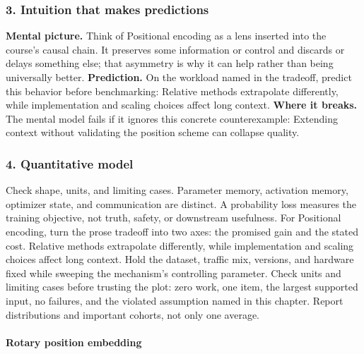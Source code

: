 \subsubsection*{3. Intuition that makes predictions}
\textbf{Mental picture.} Think of Positional encoding as a lens inserted into the course's causal chain. It preserves some information or control and discards or delays something else; that asymmetry is why it can help rather than being universally better.
\textbf{Prediction.} On the workload named in the tradeoff, predict this behavior before benchmarking: Relative methods extrapolate differently, while implementation and scaling choices affect long context.
\textbf{Where it breaks.} The mental model fails if it ignores this concrete counterexample: Extending context without validating the position scheme can collapse quality.
\subsubsection*{4. Quantitative model}
Check shape, units, and limiting cases. Parameter memory, activation memory, optimizer state, and communication are distinct. A probability loss measures the training objective, not truth, safety, or downstream usefulness.
For Positional encoding, turn the prose tradeoff into two axes: the promised gain and the stated cost. Relative methods extrapolate differently, while implementation and scaling choices affect long context. Hold the dataset, traffic mix, versions, and hardware fixed while sweeping the mechanism's controlling parameter.
Check units and limiting cases before trusting the plot: zero work, one item, the largest supported input, no failures, and the violated assumption named in this chapter. Report distributions and important cohorts, not only one average.
\paragraph{Rotary position embedding}
